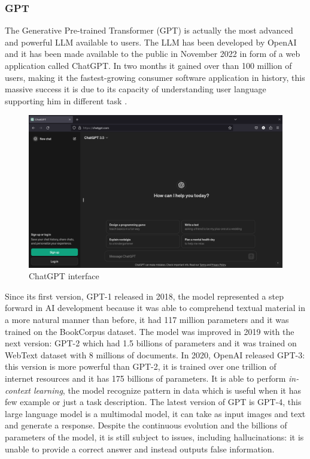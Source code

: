 \subsubsection{GPT}
The Generative Pre-trained Transformer (GPT) is actually the most advanced and powerful LLM available to users. The LLM has been developed by OpenAI and it has been made available to the public in November 2022 in form of a web application called ChatGPT. In two months it gained over than 100 million of users, making it the  fastest-growing consumer software application in history, this massive success it is due to its capacity of understanding user language supporting him in different task \cite{chatgpt_wiki}. 
\begin{figure}[H]
    \centering
    \includegraphics[width=0.9\linewidth]{Figures/fig_18.png}
    \caption{ChatGPT interface}
    \label{fig:enter-label}
\end{figure}
Since its first version, GPT-1 released in 2018, the model represented a step forward in AI development because it was able to comprehend textual material in a more natural manner than before, it had 117 million parameters and it was trained on the BookCorpus dataset. The model was improved in 2019 with the next version: GPT-2 which had 1.5 billions of parameters and it was trained on WebText dataset with 8 millions of documents.\cite{radford2019language} In 2020, OpenAI released GPT-3: this version is more powerful than GPT-2, it is trained over one trillion of internet resources and it has 175 billions of parameters. It is able to perform \textit{in-context learning}, the model recognize pattern in data which is useful when it has few example or just a task description. \cite{journey_gpt}
The latest version of GPT is GPT-4, this large language model is a multimodal model, it can take as input images and text and generate a response. Despite the continuous evolution and the billions of parameters of the model, it is still subject to issues, including hallucinations: it is unable to provide a correct answer and instead outputs false information.\cite{achiam2023gpt}
